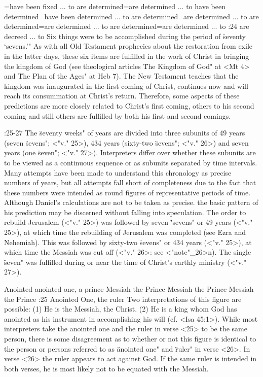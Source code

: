 ={have been fixed ... to} %
    {are determined}={are determined ... to}  %
    {have been determined}={have been determined ... to}  %
    {are determined}={are determined ... to} %
    {are determined}={are determined ... to} %
    {are determined}={are determined ... to} %
:24 {are decreed ... to} Six things were to be
accomplished during the period of \"seventy `sevens.'\thinspace"
As with all Old Testament prophecies about the restoration from exile in the latter days, these six items 
are fulfilled in the work of Christ in bringing the kingdom of God (see theological articles \"The Kingdom of God" at <Mt 4> and \"The Plan of the Ages" at Heb 7). The New Testament teaches that the kingdom was inaugurated in the first coming of Christ, continues now and will reach its consummation at Christ's return. Therefore, some aspects of these predictions are more closely related to 
Christ's first coming, others to his second coming and still others are fulfilled by both his first and second comings. 

:25-27 {}  The \"seventy weeks" of years are divided into three subunits of 49 years (seven \"sevens";
<"v." 25>), 434 years (sixty-two  \"sevens"; <"v." 26>) and seven years (one \"seven"; <"v." 27>).
Interpreters  differ over whether these subunits are to be viewed as a continuous sequence or as subunits
separated by time intervals. Many attempts have been made to understand this chronology as precise numbers of years, but all attempts fall short of completeness due to the fact that these numbers were intended as round figures of representative periods of time. Although Daniel's calculations are not to be taken as precise. the basic pattern of his prediction may be discerned without falling into speculation. The order to rebuild Jerusalem (<"v." 25>) was followed by seven \"'sevens" or 49 years (<"v." 25>), at which time the rebuilding of Jerusalem was completed (see Ezra and Nehemiah). This was followed by sixty-two \"sevens" or 434 years 
(<"v."  25>), at which time the Messiah was cut off (<"v." 26>: see <"note"_26>n). The single \"seven" was fulfilled during or near the time of 
Christ's earthly ministry (<"v." 27>).

    {Anointed} %
    {anointed one, a prince} %
    {Messiah the Prince} %
    {Messiah the Prince} %
    {Messiah the Prince} %
:25 {Anointed One, the ruler} Two interpretations of this figure are possible: (1) He is the Messiah, the Christ. (2) He is a king 
whom God has anointed as his instrument in accomplishing his will (cf. <Isa 45:1>). While most interpreters take the anointed one and 
the ruler in verse <25> to be the same person, there is some disagreement as to whether or not this
figure is identical to the person or persons referred to as \"anointed one" and \"ruler" in verse 
<26>. In verse <26> the ruler appears to act against God. If the same ruler is intended in both verses, he is most likely not to be equated 
with the Messiah.

